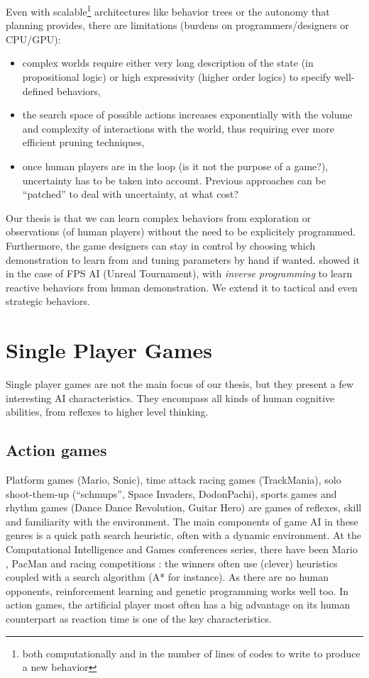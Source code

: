 Even with scalable\footnote{both computationally and in the number of lines of codes to write to produce a new behavior} architectures like behavior trees or the autonomy that planning provides, there are limitations (burdens on programmers/designers or CPU/GPU):
\begin{itemize}
    \item complex worlds require either very long description of the state (in propositional logic) or high expressivity (higher order logics) to specify well-defined behaviors,
    \item the search space of possible actions increases exponentially with the volume and complexity of interactions with the world, thus requiring ever more efficient pruning techniques,
    \item once human players are in the loop (is it not the purpose of a game?), uncertainty has to be taken into account. Previous approaches can be ``patched'' to deal with uncertainty, at what cost?
\end{itemize}
Our thesis is that we can learn complex behaviors from exploration or observations (of human players) without the need to be explicitely programmed. Furthermore, the game designers can stay in control by choosing which demonstration to learn from and tuning parameters by hand if wanted. \citet{LeHy04} showed it in the case of FPS AI (Unreal Tournament), with \textit{inverse programming} to learn reactive behaviors from human demonstration. We extend it to tactical and even strategic behaviors.


\section{Single Player Games}

Single player games are not the main focus of our thesis, but they present a few interesting AI characteristics. They encompass all kinds of human cognitive abilities, from reflexes to higher level thinking.

\subsection{Action games}
Platform games (Mario, Sonic), time attack racing games (TrackMania), solo shoot-them-up (``schmups'', Space Invaders, DodonPachi), sports games and rhythm games (Dance Dance Revolution, Guitar Hero) are games of reflexes, skill and familiarity with the environment. The main components of game AI in these genres is a quick path search heuristic, often with a dynamic environment. At the Computational Intelligence and Games conferences series, there have been Mario \citep{TogeliusMario10}, PacMan \citep{PacManCEC11} and racing competitions \citep{CarRacingWCCI08}: the winners often use (clever) heuristics coupled with a search algorithm (A* for instance). As there are no human opponents, reinforcement learning and genetic programming works well too. In action games, the artificial player most often has a big advantage on its human counterpart as reaction time is one of the key characteristics.

